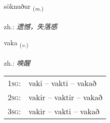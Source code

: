 \documentclass[frontgrid, backgrid]{flacards}\usepackage[]{graphicx}\usepackage[]{xcolor}
\begin{document}
\renewcommand{\flhead}{\vskip5pt \fboxsep=0pt {\small\bfseries\footnotesize Nafnorð | 名词}}
\renewcommand{\fcfoot}{\vskip5pt \fboxsep=0pt \hspace{2pt}{\small\bfseries\footnotesize 3K}}

\renewcommand{\blhead}{\vskip5pt {\small\bfseries\footnotesize Nafnorð | 名词 }}
\renewcommand{\bcfoot}{\vskip5pt \hspace{2pt}{\small\bfseries\footnotesize 3K}}


{söknuður \small{\textsubscript{(\textit{m.})}} \\[1ex] %
\textphonetic{[sœhknʏðʏr]} \\
zh.: \emph{遗憾，失落感} \\  [2ex]
\renewcommand*{\arraystretch}{0.8}
}

\renewcommand{\flhead}{\vskip5pt \fboxsep=0pt {\small\bfseries\footnotesize Sagnorð | 动词}}
\renewcommand{\fcfoot}{\vskip5pt \fboxsep=0pt \hspace{2pt}{\small\bfseries\footnotesize 3K}}

\renewcommand{\blhead}{\vskip5pt {\small\bfseries\footnotesize Sagnorð | 动词 }}
\renewcommand{\bcfoot}{\vskip5pt \hspace{2pt}{\small\bfseries\footnotesize 3K}}


{vaka \small{\textsubscript{(\textit{v.})}} \\[1ex] %
\textphonetic{[vaːka]} \\
zh.: \emph{唤醒} \\  [2ex]
\renewcommand*{\arraystretch}{0.8}
\begin{tabular}{p{1cm}l}
\textsc{1sg}: & vaki -- vakti -- vakað \\ 
\textsc{2sg}: & vakir -- vaktir -- vakað \\ 
\textsc{3sg}: & vakir -- vakti -- vakað \\ 
\end{tabular}
}
\end{document}
